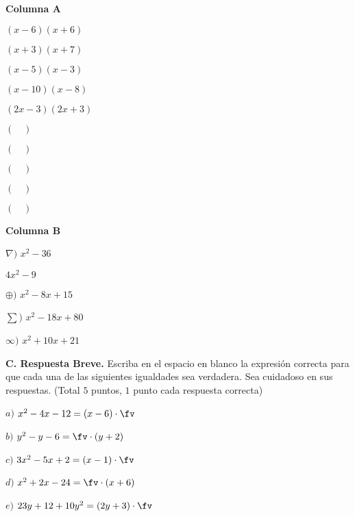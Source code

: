 \documentclass[fleqn]{article}
\begin{document}
\begin{multicols}{3}

{\hspace{10mm}\bf Columna A}
\vs\vs

\benu
\item[] $(x-6)(x+6)$
\vs
\item[] $(x+3)(x+7)$
\vs
\item[] $(x-5)(x-3)$
\vs
\item[] $(x-10)(x-8)$
\vs
\item[] $(2x-3)(2x+3)$
\vs
\eenu
 
{\hspace{15mm}}
\vs\vs

\benu
\item[] $(\,\,\,\,\,\,)$
\vs
\item[] $(\,\,\,\,\,\,)$
\vs
\item[] $(\,\,\,\,\,\,)$
\vs
\item[] $(\,\,\,\,\,\,)$
\vs
\item[] $(\,\,\,\,\,\,)$
\vs
\eenu

{\hspace{15mm}\bf Columna B}
\vs

\hspace{5mm}

\benu
\item[{\boldmath $\nabla)$}] $x^2-36$
\vs
\item[\hp{\boldmath $\Delta)$}] $4x^2-9$
\vs
\item[{\boldmath $\oplus)$}] $x^2-8x+15$
\vs
\item[{\boldmath $\sum)$}] $x^2-18x+80$
\vs
\item[{\boldmath $\infty)$}] $x^2+10x+21$
\eenu

\end{multicols}

\vs\vs

{\bf C. Respuesta Breve.} Escriba en el espacio en blanco la expresión correcta para que cada una de las siguientes igualdades sea verdadera. Sea cuidadoso en sus respuestas. (Total $5$ puntos, $1$ punto cada respuesta correcta)

\benu
\vs
\vs
\item[{\boldmath $a)$}] $x^2-4x-12 =(x-6)\cdot\fv$
\vs
\item[{\boldmath $b)$}] $y^2-y-6 =\fv\cdot(y+2)$
\vs
\item[{\boldmath $c)$}] $3x^2-5x+2 =(x-1)\cdot\fv$
\vs
\item[{\boldmath $d)$}] $x^2+2x-24 =\fv\cdot(x+6)$
\vs
\item[{\boldmath $e)$}] $23y+12+10y^2 =(2y+3)\cdot\fv$
\eenu
\end{document}
